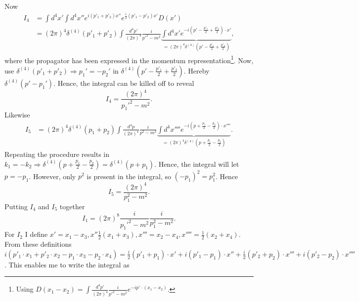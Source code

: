 \begin{example}
\begin{enumerate}
\begin{equation}
\begin{split}
			\end{split}	
		\end{equation}  
		Now
		\begin{equation}
			\begin{split}
				I_4&=\int d^4x' \int d^4x''e^{i(p'_1+p'_2)x''}e^{\frac{i}{2}(p'_1-p'_2)x'}D(x')\\
				&=(2\pi)^4\delta^{(4)}(p'_1+p'_2)\int\frac{d^4p'}{(2\pi)^4}\frac{i}{p'^2-m^2}\underbrace{\int d^4x'e^{-i(p'-\frac{p'_1}{2}+\frac{p'_2}{2})\cdot x'}}_{=(2\pi)^4\delta^{(4)}(p'-\frac{p'_1}{2}+\frac{p'_2}{2})},
			\end{split}
		\end{equation} 
		where the propagator has been expressed in the momentum representation\footnote{Using $D(x_1-x_2)=\int\frac{d^4p'}{(2\pi)^4}\frac{i}{p'^2-m^2}e^{-ip'\cdot(x_1-x_2)}$.}. Now, use $\delta^{(4)}(p'_1+p'_2)\Rightarrow p_1'=-p_2'$ in $\delta^{(4)}(p'-\frac{p'_1}{2}+\frac{p'_2}{2})$. Hereby $\delta^{(4)}(p'-p_1')$. Hence, the integral can be killed off to reveal
		\begin{equation}
			I_4=\frac{(2\pi)^4}{p_1'^2-m^2}.
		\end{equation} 
		Likewise
		\begin{equation}
			\begin{split}
				I_5&=(2\pi)^4\delta^{(4)}(p_1+p_2)\int\frac{d^4p}{(2\pi)^4}\frac{i}{p^2-m^2}\underbrace{\int d^4x''''e^{-i(p+\frac{p_1}{2}-\frac{p_2}{2})\cdot x''''}}_{=(2\pi)^4\delta^{(4)}(p+\frac{p_1}{2}-\frac{p_2}{2})}.
			\end{split}
		\end{equation} 
		Repeating the procedure results in $k_1=-k_2\Rightarrow \delta^{(4)}(p+\frac{p_1}{2}-\frac{p_2}{2})=\delta^{(4)}(p+p_1)$. Hence, the integral will let $p=-p_1$. However, only $p^2$ is present in the integral, so $(-p_1)^2=p_1^2$. Hence
		\begin{equation}
			I_5=\frac{(2\pi)^4}{p_1^2-m^2}.
		\end{equation} 
		Putting $I_4$ and $I_5$ together
		\begin{equation}
			I_1=(2\pi)^8\frac{i}{p_1'^2-m^2}\frac{i}{p_1^2-m^2}.
		\end{equation}  
		For $I_2$ I define $x'=x_1-x_3, x''\frac{1}{2}(x_1+x_3), x'''=x_2-x_4, x''''=\frac{1}{2}(x_2+x_4)$. From these definitions $i(p'_1\cdot x_1+p'_2\cdot x_2-p_1\cdot x_3-p_2\cdot x_4)=\frac{i}{2}(p'_1+p_1)\cdot x'+i(p'_1-p_1)\cdot x''+\frac{i}{2}(p'_2+p_2)\cdot x'''+i(p'_2-p_2)\cdot x''''$. This enables me to write the integral as
		\begin{equation}

\end{equation}
\end{enumerate}
\end{example}

